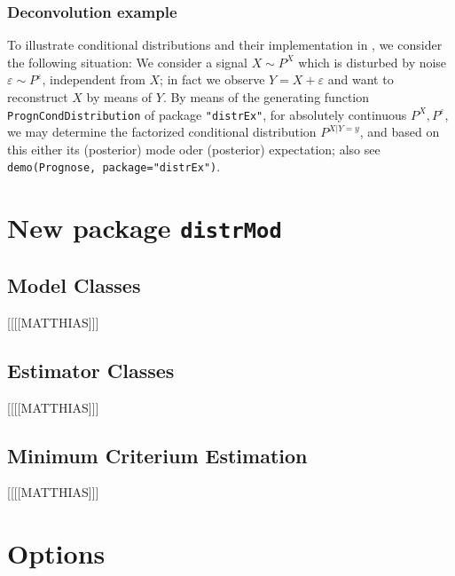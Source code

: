 \documentclass[11pt]{article}
\newcommand{\code}[1]{{\tt #1}}
\newcommand{\pkg}[1]{{\tt "#1"}}
\begin{document}
\subsubsection{Deconvolution example}

To illustrate conditional distributions and their implementation in
\linebreak[4]\pkg{distrEx}, we consider the following situation:
We consider a signal $X\sim P^X$ which is disturbed by noise
$\varepsilon\sim P^\varepsilon$, independent from $X$; in fact we observe
$Y=X+\varepsilon$ and want to reconstruct $X$ by means of $Y$. By means of the
generating function \code{PrognCondDistribution}
of package \pkg{distrEx}, for absolutely continuous $P^X, P^\varepsilon$, we may
determine the factorized conditional distribution $P^{X|Y=y}$, and based on this
either its (posterior) mode oder (posterior) expectation; also see
\code{demo(Prognose, package="distrEx")}.

%
\section[New package distrMod]{New package {\tt distrMod}}\label{distrMod}
%
\subsection{Model Classes}
%
[[[[MATTHIAS]]]
\subsection{Estimator Classes}
%
[[[[MATTHIAS]]]
%
\subsection{Minimum Criterium Estimation}
%
[[[[MATTHIAS]]]
%
%
\section{Options}\label{options}
%
%
\end{document}
